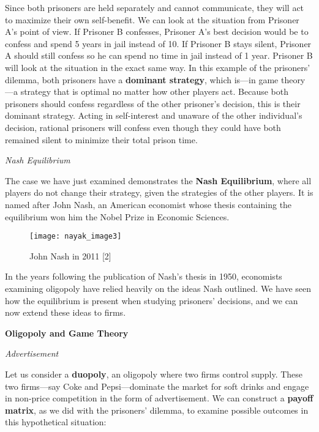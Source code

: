     \pagebreak
    Since both prisoners are held separately and cannot communicate, they will act to maximize their own self-benefit. We can look at the situation from Prisoner A’s point of view. If Prisoner B confesses, Prisoner A’s best decision would be to confess and spend 5 years in jail instead of 10. If Prisoner B stays silent, Prisoner A should still confess so he can spend no time in jail instead of 1 year. Prisoner B will look at the situation in the exact same way. In this example of the prisoners’ dilemma, both prisoners have a \textbf{dominant strategy}, which is—in game theory—a strategy that is optimal no matter how other players act. Because both prisoners should confess regardless of the other prisoner’s decision, this is their dominant strategy. Acting in self-interest and unaware of the other individual’s decision, rational prisoners will confess even though they could have both remained silent to minimize their total prison time.

\noindent
\emph{Nash Equilibrium}

The case we have just examined demonstrates the \textbf{Nash Equilibrium}, where all players do not change their strategy, given the strategies of the other players. It is named after John Nash, an American economist whose thesis containing the equilibrium won him the Nobel Prize in Economic Sciences.

\begin{figure}[htp]
    \centering
    \begin{minipage}{9cm}
    \texttt{[image: nayak\_image3]}
    \caption{John Nash in 2011 [2]}
    \label{fig:2}
    \end{minipage}
\end{figure}

\pagebreak
In the years following the publication of Nash’s thesis in 1950, economists examining oligopoly have relied heavily on the ideas Nash outlined. We have seen how the equilibrium is present when studying prisoners’ decisions, and we can now extend these ideas to firms.


\pagebreak
\noindent
\textbf{Oligopoly and Game Theory}

\noindent
\emph{Advertisement}

Let us consider a \textbf{duopoly}, an oligopoly where two firms control supply. These two firms—say Coke and Pepsi—dominate the market for soft drinks and engage in non-price competition in the form of advertisement. We can construct a \textbf{payoff matrix}, as we did with the prisoners’ dilemma, to examine possible outcomes in this hypothetical situation:


